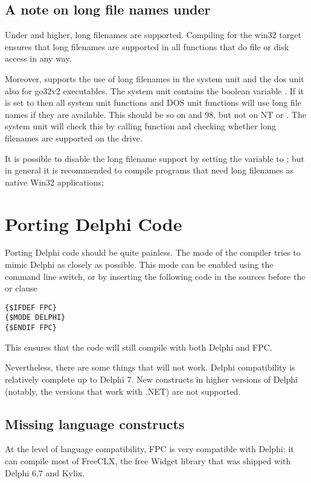 \subsection{A note on long file names under \dos}
Under  and higher, long filenames are supported. Compiling
for the win32 target ensures that long filenames are supported in all
functions that do file or disk access in any way.

Moreover, \fpc supports the use of long filenames in the system unit and
the dos unit also for go32v2 executables. The system unit contains the
boolean variable . If it is set to  then all
system unit functions and DOS unit functions will use long file names
if they are available. This should be so on  and 98, but
not on \windows NT or . The system unit will check this 
by calling \dos function  and checking whether long filenames 
are supported on the  drive.

It is possible to disable the long filename support by setting the
 variable to ; but in general it is recommended
to compile programs that need long filenames as native Win32 applications;

\section{Porting Delphi Code}

Porting Delphi code should be quite painless. The  mode of the 
compiler tries to mimic Delphi as closely as possible. 
This mode can be enabled using the  command line switch, 
or by inserting the following code in the sources before the  
or  clause
\begin{verbatim}
{$IFDEF FPC}
{$MODE DELPHI}
{$ENDIF FPC}
\end{verbatim}
This ensures that the code will still compile with both Delphi and FPC.

Nevertheless, there are some things that will not work. 
Delphi compatibility is relatively complete up to Delphi 7. 
New constructs in higher versions of Delphi 
(notably, the versions that work with .NET) are not supported.

\subsection{Missing language constructs}
At the level of language compatibility, FPC is very compatible with Delphi:
it can compile most of FreeCLX, the free Widget library that was shipped 
with Delphi 6,7 and Kylix.

